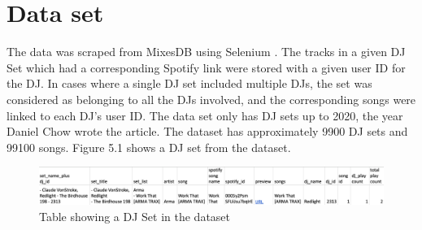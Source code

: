\section{Data set}
The data was scraped from MixesDB using Selenium \citep{chow_music_2020}. The tracks in a given DJ Set which had a corresponding Spotify link were stored with a given user ID for the DJ.  In cases where a single DJ set included multiple DJs, the set was considered as belonging to all the DJs involved, and the corresponding songs were linked to each DJ's user ID. The data set only has DJ sets up to 2020, the year Daniel Chow wrote the article. The dataset has approximately 9900 DJ sets and 99100 songs. Figure 5.1 shows a DJ set from the dataset.
\begin{figure}[H]
	\includegraphics[scale=0.4]{images/dataset}
	\centering
	\caption{Table showing a DJ Set in the dataset} 
\end{figure}


